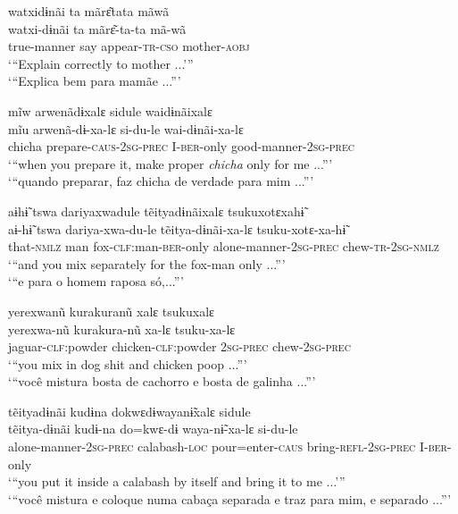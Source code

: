 \documentclass[output=paper,
modfonts,nonflat
]{langsci/langscibook}
\begin{document}
\ea watxidɨnãi ta mãrɛ͂tata mãwã\\[.3em]
\gll watxi-dɨnãi	ta	mãrɛ͂-ta-ta			mã-wã\\
true-manner	say	appear-\textsc{tr-cso}{\footnotemark}	mother-\textsc{aobj}\\
\glt ‘“Explain correctly to mother ...’”\\
‘“Explica bem para mamãe ...”'
\z

\ea mĩw arwenãdɨxalɛ sidule waidɨnãixalɛ\\[.3em]
\gll mĩu	arwenã-dɨ-xa-lɛ			si-du-le		wai-dɨnãi-xa-lɛ\\
chicha{\footnotemark}	prepare-\textsc{caus-2sg-prec}	I-\textsc{ber}-only	good-manner-\textsc{2sg-prec}\\
\glt ‘“when you prepare it, make proper \textit{chicha} only for me ...”’\\
‘“quando preparar, faz chicha de verdade para mim ...”'
\z

\ea aɨhɨ̃ tswa dariyaxwadule tẽityadɨnãixalɛ tsukuxotɛxahɨ̃\\[.3em]
\gll aɨ-hɨ̃		tswa	dariya-xwa-du-le			tẽitya-dɨnãi-xa-lɛ			tsuku-xotɛ-xa-hɨ̃\\
that-\textsc{nmlz}	man	fox-\textsc{clf}:man-\textsc{ber}-only	alone-manner-\textsc{2sg-prec}	chew-\textsc{tr-2sg-nmlz}\\
\glt ‘“and you mix separately for the fox-man only ...”’\\
‘“e para o homem raposa só,...”'
\z

\ea yerexwanũ kurakuranũ xalɛ tsukuxalɛ\\[.3em]
\gll yerexwa-nũ			kurakura-nũ			xa-lɛ		tsuku-xa-lɛ\\
jaguar-\textsc{clf}:powder	chicken-\textsc{clf}:powder	\textsc{2sg-prec}	chew-\textsc{2sg-prec}\\
\glt ‘“you mix in dog shit and chicken poop ...”’\\
‘“você mistura bosta de cachorro e bosta de galinha ...”'
\z

\ea tẽityadɨnãi kudɨna dokwɛdɨwayanɨ̃xalɛ sidule\\[.3em]
\gll tẽitya-dɨnãi				kudɨ-na		do=kwɛ-dɨ		waya-nɨ̃-xa-lɛ				si-du-le\\
alone-manner-\textsc{2sg-prec}	calabash-\textsc{loc}	pour=enter-\textsc{caus}	bring-\textsc{refl-2sg-prec}	I-\textsc{ber}-only\\
\glt ‘“you put it inside a calabash by itself and bring it to me ...’”\\
‘“você mistura e coloque numa cabaça separada e traz para mim, e separado ...”'
\z
\end{document}
